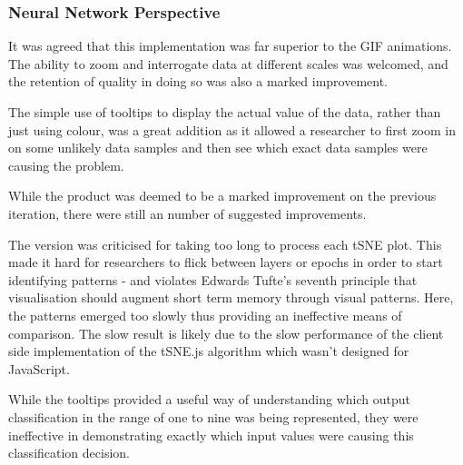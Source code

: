 \documentclass[a4paper,11pt,titlepage]{article}
\begin{document}
	\subsubsection{Neural Network Perspective}
		It was agreed that this implementation was far superior to the GIF animations. The ability to zoom and interrogate data at different scales was welcomed, and the retention of quality in doing so was also a marked improvement.
		\par 
		The simple use of tooltips to display the actual value of the data, rather than just using colour, was a great addition as it allowed a researcher to first zoom in on some unlikely data samples and then see which exact data samples were causing the problem.
		\par 
		While the product was deemed to be a marked improvement on the previous iteration, there were still an number of suggested improvements.
		\par 
		The version was criticised for taking too long to process each tSNE plot. This made it hard for researchers to flick between layers or epochs in order to start identifying patterns - and violates Edwards Tufte's seventh principle that visualisation should augment short term memory through visual patterns. Here, the patterns emerged too slowly thus providing an ineffective means of comparison. The slow result is likely due to the slow performance of the client side implementation of the tSNE.js algorithm which wasn't designed for JavaScript.
		\par 
		While the tooltips provided a useful way of understanding which output classification in the range of one to nine was being represented, they were ineffective in demonstrating exactly which input values were causing this classification decision. 
\end{document}
